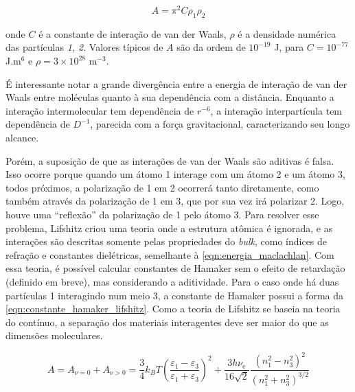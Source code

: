 	\begin{equation}
		A = \pi^2 C \rho_1 \rho_2
		\label{eqn:constante_hamaker}
	\end{equation}
	
	\noindent onde \(C\) é a constante de interação de van der Waals, \(\rho\) é a densidade numérica das partículas \emph{1, 2}. Valores típicos de \(A\) são da ordem de \(10^{-19}\) J, para \(C = 10^{-77}\) J.m\(^6\) e \(\rho=3 \times 10^{28}\) m\(^{-3}\).
	
	É interessante notar a grande divergência entre a energia de interação de van der Waals entre moléculas quanto à sua dependência com a distância. Enquanto a interação intermolecular tem dependência de \(r^{-6}\), a interação interpartícula tem dependência de \(D^{-1}\), parecida com a força gravitacional, caracterizando seu longo alcance.

	Porém, a suposição de que as interações de van der Waals são aditivas é falsa. Isso ocorre porque quando um átomo 1 interage com um átomo 2 e um átomo 3, todos próximos, a polarização de 1 em 2 ocorrerá tanto diretamente, como também através da polarização de 1 em 3, que por sua vez irá polarizar 2. Logo, houve uma ``reflexão'' da polarização de 1 pelo átomo 3. Para resolver esse problema, Lifshitz  criou uma teoria onde a estrutura atômica é ignorada, e as interações são descritas somente pelas propriedades do \emph{bulk}, como índices de refração e constantes dielétricas, semelhante à \autoref{eqn:energia_maclachlan}. Com essa teoria, é possível calcular constantes de Hamaker sem o efeito de retardação (definido em breve), mas considerando a aditividade. Para o caso onde há duas partículas 1 interagindo num meio 3, a constante de Hamaker possui a forma da \autoref{eqn:constante_hamaker_lifshitz}. Como a teoria de Lifshitz se baseia na teoria do contínuo, a separação dos materiais interagentes deve ser maior do que as dimensões moleculares.
	
	\begin{equation}
	A = A_{\nu=0} + A_{\nu>0}  = \frac{3}{4} k_BT \left( \frac { \varepsilon_{1}-\varepsilon_{3}} { \varepsilon_{1} + \varepsilon_{3} } \right)^{2} + \frac{3h\nu_{\mathrm{e} } } {16\sqrt{2}} \frac{\left(n_{1}^{2} - n_{3}^{2} \right)^{2}} {\left(n_{1}^{2} + n_{3}^{2} \right)^{3/2} }
	\label{eqn:constante_hamaker_lifshitz}
	\end{equation} 
	
